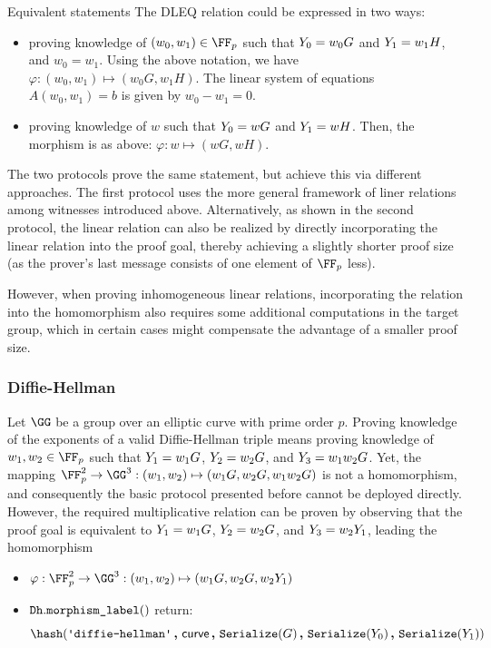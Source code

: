 \documentclass[11pt]{article}
\begin{document}
\begin{remark}{Equivalent statements}{}
  The DLEQ relation could be expressed in two ways:
  \begin{itemize}
    \item proving knowledge of $(w_0,w_1)\in\FF_p$ such that $Y_0=w_0G$ and $Y_1=w_1H$, and $w_0=w_1$.
  Using the above notation, we have $\varphi: (w_0,w_1)\mapsto (w_0G,w_1H)$.
  The linear system of equations $A(w_0,w_1)=b$ is given by $w_0-w_1=0$.

  \item proving knowledge of $w$ such that $Y_0 = wG$ and $Y_1 = w H$. Then, the morphism is as above: $\varphi: w \mapsto (wG, wH)$.
  \end{itemize}
  The two protocols prove the same statement, but achieve this via different approaches.
  The first protocol uses the more general framework of liner relations among witnesses introduced above.
  Alternatively, as shown in the second protocol, the linear relation can also be realized by  directly incorporating the linear relation into the proof goal, thereby achieving a slightly shorter proof size (as the prover's last message consists of one element of $\FF_p$ less).

  However, when proving inhomogeneous linear relations, incorporating the relation into the homomorphism also requires some additional computations in the target group, which in certain cases might compensate the advantage of a smaller proof size.
\end{remark}


\subsubsection{Diffie-Hellman}
Let $\GG$ be a group over an elliptic curve with prime order $p$.
Proving knowledge of the exponents of a valid Diffie-Hellman triple means proving knowledge of $w_1,w_2\in\FF_p$ such that $Y_1=w_1G$, $Y_2=w_2G$, and $Y_3=w_1 w_2 G$.
Yet, the mapping $\FF_p^2\to\GG^3:(w_1,w_2)\mapsto (w_1G,w_2G,w_1w_2G)$ is not a homomorphism, and consequently the basic protocol presented before cannot be deployed directly.
However, the required multiplicative relation can be proven by observing that the proof goal is equivalent to $Y_1=w_1G$, $Y_2=w_2G$, and $Y_3=w_2Y_1$, leading the homomorphism

\begin{itemize}
  \item  $\varphi:\FF_p^2\to\GG^3:(w_1,w_2)\mapsto(w_1G,w_2G,w_2\statement_1)$
  \item $\texttt{Dh}.\texttt{morphism\_label}()$ return:
  \[
    \hash(\dhlabel \concat \curvectx \concat \serialize(G) \concat \serialize(\statement_0) \concat \serialize(\statement_1))
  \]
\end{itemize}
\end{document}
